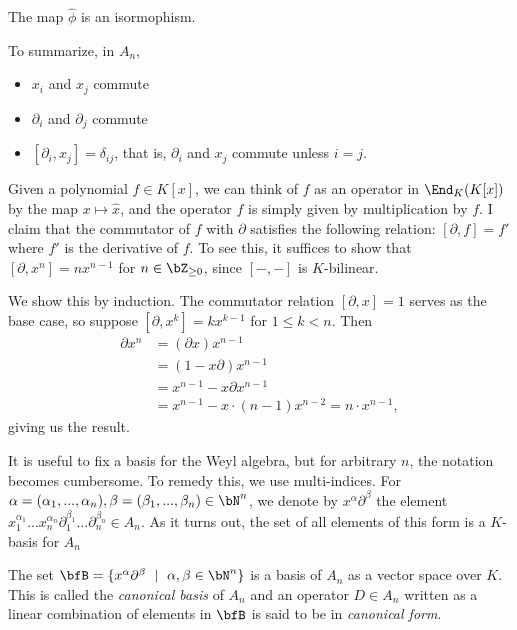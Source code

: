 \begin{thm}\label{thm:Weyl-constructions-iso}
	The map $\hat{\phi}$ is an isormophism.
\end{thm}

\noindent To summarize, in $A_n$,
\begin{itemize}
	\item $x_i$ and $x_j$ commute
	\item $\partial_i$ and $\partial_j$ commute
	\item $[\partial_i,x_j] = \delta_{ij}$, that is, $\partial_i$ and $x_j$ commute unless $i = j$.
\end{itemize}
\begin{example}\label{example:commutator-as-derivative-one-dim}
    Given a polynomial $f \in K[x]$, we can think of $f$ as an operator in $\End_K(K[x])$ by the map $x \mapsto \hat{x}$, and the operator $f$ is simply given by multiplication by $f$. I claim that the commutator of $f$ with $\partial$ satisfies the following relation: $[\partial, f] = f'$ where $f'$ is the derivative of $f$. To see this, it suffices to show that $[\partial, x^n] = nx^{n-1}$ for $n \in \bZ_{\geq 0}$, since $[-,-]$ is $K$-bilinear.

	We show this by induction. The commutator relation $[\partial,x] = 1$ serves as the base case, so suppose $[\partial, x^k] = kx^{k-1}$ for $1\leq k < n$. Then
	\begin{align*}
		\partial x^n
		&= (\partial x)x^{n-1} \\
		&= (1 - x\partial)x^{n-1} \\
		&= x^{n-1} - x\partial x^{n-1} \\
		&= x^{n-1} - x\cdot (n-1) x^{n-2} = n\cdot x^{n-1},
	\end{align*}
	giving us the result.
\end{example}
It is useful to fix a basis for the Weyl algebra, but for arbitrary $n$, the notation becomes cumbersome. To remedy this, we use multi-indices. For $\alpha = (\alpha_1,...,\alpha_n), \beta = (\beta_1,...,\beta_n)\in \bN^n$, we denote by $x^\alpha\partial^\beta$ the element $x_1^{\alpha_1}...x_n^{\alpha_n}\partial_1^{\beta_1}...\partial_n^{\beta_n} \in A_n$. As it turns out, the set of all elements of this form is a $K$-basis for $A_n$
\begin{prop}\label{prop:canonical-basis}
	The set $\bfB = \{x^\alpha\partial^\beta ~ \mid ~ \alpha,\beta\in \bN^n\}$ is a basis of $A_n$ as a vector space over $K$. This is called the \emph{canonical basis} of $A_n$ and an operator $D \in A_n$ written as a linear combination of elements in $\bfB$ is said to be in \emph{canonical form}.
\end{prop}

